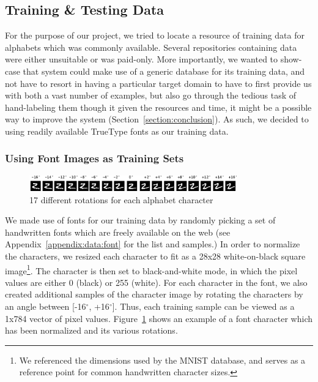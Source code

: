 \documentclass[12pt]{article}
\newcommand{\degree}{\ensuremath{^\circ}}
\begin{document}
	\subsection{Training \& Testing Data}
	For the purpose of our project, we tried to locate a resource of training data for alphabets which was commonly available. Several repositories containing data were either unsuitable or was paid-only. More importantly, we wanted to show-case that system could make use of a generic database for its training data, and not have to resort in having a particular target domain to have to first provide us with both a vast number of examples, but also go through the tedious task of hand-labeling them though it given the resources and time, it might be a possible way to improve the system (Section~\ref{section:conclusion}). As such, we decided to using readily available TrueType fonts as our training data.
			
		\subsubsection{Using Font Images as Training Sets}
		
		\begin{figure}[htbp!]
		\centering
		\includegraphics[width=0.8\textwidth]{training_data.eps}
		\caption{17 different rotations for each alphabet character}
		\label{figure:training_data}
		\end{figure}
		
		We made use of fonts for our training data by randomly picking a set of handwritten fonts which are freely available on the web (see Appendix~\ref{appendix:data:font} for the list and samples.) In order to normalize the characters, we resized each character to fit as a 28x28 white-on-black square image\footnote{We referenced the dimensions used by the MNIST database, and serves as a reference point for common handwritten character sizes.}. The character is then set to black-and-white mode, in which the pixel values are either 0 (black) or 255 (white). For each character in the font, we also created additional samples of the character image by rotating the characters by an angle between [-16\degree, +16\degree]. Thus, each training sample can be viewed as a 1x784 vector of pixel values. Figure~\ref{figure:training_data} shows an example of a font character which has been normalized and its various rotations.	
	
\end{document}
